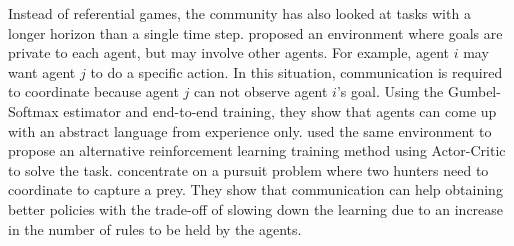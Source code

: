 
Instead of referential games, the community has also looked at tasks with a longer horizon than a single time step. \cite{mordatch_emergence_2017} proposed an environment where goals are private to each agent, but may involve other agents. For example, agent $i$ may want agent $j$ to do a specific action. In this situation, communication is required to coordinate because agent $j$ can not observe agent $i$'s goal. Using the Gumbel-Softmax estimator and end-to-end training, they show that agents can come up with an abstract language from experience only. \cite{lowe_multi-agent_2017} used the same environment to propose an alternative reinforcement learning training method using Actor-Critic to solve the task. \cite{kasai_learning_2008} concentrate on a pursuit problem where two hunters need to coordinate to capture a prey. They show that communication can help obtaining better policies with the trade-off of slowing down the learning due to an increase in the number of rules to be held by the agents. 





